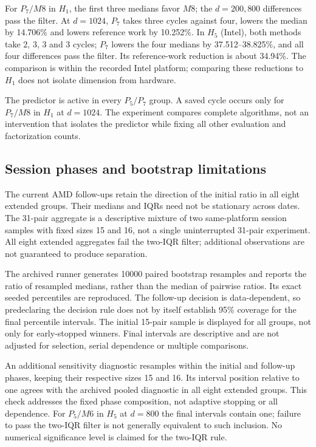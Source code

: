 \documentclass[11pt]{article}
\begin{document}
For $P_7/M8$ in $H_1$, the first three medians favor $M8$; the $d=200,800$ differences pass the filter. At $d=1024$, $P_7$ takes three cycles against four, lowers the median by 14.706\% and lowers reference work by 10.252\%. In $H_5$ (Intel), both methods take 2, 3, 3 and 3 cycles; $P_7$ lowers the four medians by 37.512--38.825\%, and all four differences pass the filter. Its reference-work reduction is about 34.94\%. The comparison is within the recorded Intel platform; comparing these reductions to $H_1$ does not isolate dimension from hardware.

The predictor is active in every $P_5/P_7$ group. A saved cycle occurs only for $P_7/M8$ in $H_1$ at $d=1024$. The experiment compares complete algorithms, not an intervention that isolates the predictor while fixing all other evaluation and factorization counts.

\subsection{Session phases and bootstrap limitations}

The current AMD follow-ups retain the direction of the initial ratio in all eight extended groups. Their medians and IQRs need not be stationary across dates. The 31-pair aggregate is a descriptive mixture of two same-platform session samples with fixed sizes 15 and 16, not a single uninterrupted 31-pair experiment. All eight extended aggregates fail the two-IQR filter; additional observations are not guaranteed to produce separation.


The archived runner generates 10000 paired bootstrap resamples and reports the ratio of resampled medians, rather than the median of pairwise ratios. Its exact seeded percentiles are reproduced. The follow-up decision is data-dependent, so predeclaring the decision rule does not by itself establish 95\% coverage for the final percentile intervals. The initial 15-pair sample is displayed for all groups, not only for early-stopped winners. Final intervals are descriptive and are not adjusted for selection, serial dependence or multiple comparisons.

An additional sensitivity diagnostic resamples within the initial and follow-up phases, keeping their respective sizes 15 and 16. Its interval position relative to one agrees with the archived pooled diagnostic in all eight extended groups. This check addresses the fixed phase composition, not adaptive stopping or all dependence. For $P_5/M6$ in $H_5$ at $d=800$ the final intervals contain one; failure to pass the two-IQR filter is not generally equivalent to such inclusion. No numerical significance level is claimed for the two-IQR rule.
\end{document}

